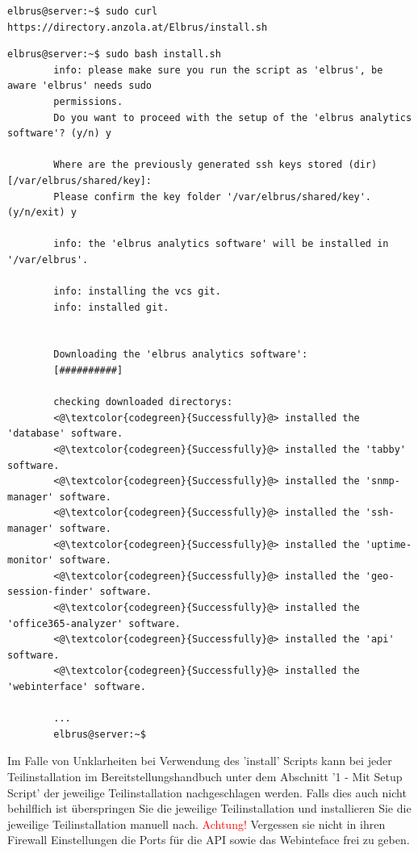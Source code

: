 \documentclass{article}
\begin{document}
	\lstset{style=commands}
	\begin{lstlisting}[caption={Installieren des 'install' Script.}]
		elbrus@server:~$ sudo curl https://directory.anzola.at/Elbrus/install.sh
	\end{lstlisting}

	\begin{lstlisting}[caption={Ausführen des 'install' Script.}]
		elbrus@server:~$ sudo bash install.sh
		info: please make sure you run the script as 'elbrus', be aware 'elbrus' needs sudo 
		permissions.
		Do you want to proceed with the setup of the 'elbrus analytics software'? (y/n) y
		
		Where are the previously generated ssh keys stored (dir) [/var/elbrus/shared/key]:
		Please confirm the key folder '/var/elbrus/shared/key'. (y/n/exit) y
		
		info: the 'elbrus analytics software' will be installed in '/var/elbrus'.
		
		info: installing the vcs git.
		info: installed git.
		
		
		Downloading the 'elbrus analytics software':
		[##########]
		
		checking downloaded directorys:
		<@\textcolor{codegreen}{Successfully}@> installed the 'database' software.
		<@\textcolor{codegreen}{Successfully}@> installed the 'tabby' software.
		<@\textcolor{codegreen}{Successfully}@> installed the 'snmp-manager' software.
		<@\textcolor{codegreen}{Successfully}@> installed the 'ssh-manager' software.
		<@\textcolor{codegreen}{Successfully}@> installed the 'uptime-monitor' software.
		<@\textcolor{codegreen}{Successfully}@> installed the 'geo-session-finder' software.
		<@\textcolor{codegreen}{Successfully}@> installed the 'office365-analyzer' software.
		<@\textcolor{codegreen}{Successfully}@> installed the 'api' software.
		<@\textcolor{codegreen}{Successfully}@> installed the 'webinterface' software.
		
		...
		elbrus@server:~$
	\end{lstlisting}
	Im Falle von Unklarheiten bei Verwendung des 'install' Scripts kann bei jeder Teilinstallation im Bereitstellungshandbuch unter dem Abschnitt '1 - Mit Setup Script' der jeweilige Teilinstallation nachgeschlagen werden. Falls dies auch nicht behilflich ist überspringen Sie die jeweilige Teilinstallation und installieren Sie die jeweilige Teilinstallation manuell nach.
	\newline \newline \newline \newline \newline \newline \newline \newline \newline \newline \newline
	\textcolor{red}{Achtung!} Vergessen sie nicht in ihren Firewall Einstellungen die Ports für die API sowie das Webinteface frei zu geben.
	\newpage
	
\end{document}
